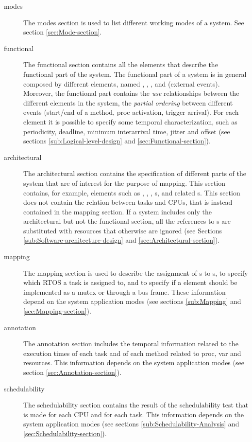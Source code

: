 \begin{description}
\item [{modes}] The modes section is used to list different working
  modes of a system. See section \ref{sec:Mode-section}.
\item [{functional}] The functional section contains all the elements
  that describe the functional part of the system. The functional part
  of a system is in general composed by different elements, named
  , , , and 
  (external events).  Moreover, the functional part contains the
  \emph{use} relationships between the different elements in the
  system, the \emph{partial ordering} between different events
  (start/end of a method, proc activation, trigger arrival). For each
  element it is possible to specify some temporal characterization,
  such as periodicity, deadline, minimum interarrival time, jitter and
  offset (see sections \ref{sub:Logical-level-design} 
  and \ref{sec:Functional-section}).
\item [{architectural}] The architectural section contains the
  specification of different parts of the system that are of interest
  for the purpose of mapping. This section contains, for example,
  elements such as , , ,
  s,  and related s. This
  section does not contain the relation between tasks and CPUs, that
  is instead contained in the mapping section.  If a system includes
  only the architectural but not the functional section, all the
  references to s are substituted with resources that
  otherwise are ignored (see Sections
  \ref{sub:Software-architecture-design} 
  and
  \ref{sec:Architectural-section}).

\item [{mapping}] The mapping section is used to describe the
  assignment of s to s, to specify which RTOS
  a task is assigned to, and to specify if a  element
  should be implemented as a mutex or through a bus frame. These
  information depend on the system application modes (see sections
  \ref{sub:Mapping} 
  and \ref{sec:Mapping-section}).
\item [{annotation}] The annotation section includes the temporal
  information related to the execution times of each task and of each
  method related to proc, var and resources. This information depends
  on the system application modes (see section
  \ref{sec:Annotation-section}).
\item [{schedulability}] The schedulability section contains the
  result of the schedulability test that is made for each CPU and for
  each task. This information depends on the system application modes
  (see sections \ref{sub:Schedulability-Analysis} and
  \ref{sec:Schedulability-section}).
\end{description}

